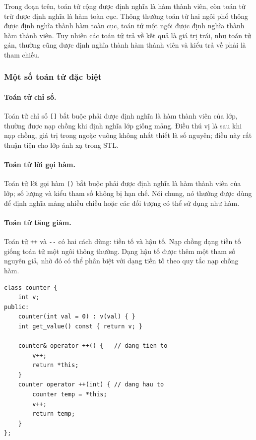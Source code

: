 \documentclass[11pt]{article}
\begin{document}
Trong đoạn trên, toán tử cộng được định nghĩa là hàm thành viên, còn toán tử
trừ được định nghĩa là hàm toàn cục. Thông thường toán tử hai ngôi phổ thông
được định nghĩa thành hàm toàn cục, toán tử một ngôi được định nghĩa thành
hàm thành viên. Tuy nhiên các toán tử trả về kết quả là giá trị trái, như
toán tử gán, thường cũng được định nghĩa thành hàm thành viên và kiểu trả về
phải là tham chiếu.

\subsubsection*{Một số toán tử đặc biệt}

\paragraph{Toán tử chỉ số.}
Toán tử chỉ số \verb|[]| bắt buộc phải được định nghĩa là hàm thành viên của
lớp, thường được nạp chồng khi định nghĩa lớp giống mảng. Điều thú vị là sau
khi nạp chồng, giá trị trong ngoặc vuông không nhất thiết là số nguyên; điều
này rất thuận tiện cho lớp ánh xạ trong STL.

\paragraph{Toán tử lời gọi hàm.}
Toán tử lời gọi hàm \verb|()| bắt buộc phải được định nghĩa là hàm thành viên
của lớp; số lượng và kiểu tham số không bị hạn chế. Nói chung, nó thường được
dùng để định nghĩa mảng nhiều chiều hoặc các đối tượng có thể sử dụng như
hàm.

\paragraph{Toán tử tăng giảm.}
Toán tử \verb|++| và \verb|--| có hai cách dùng: tiền tố và hậu tố. Nạp chồng
dạng tiền tố giống toán tử một ngôi thông thường. Dạng hậu tố được thêm một
tham số nguyên giả, nhờ đó có thể phân biệt với dạng tiền tố theo quy tắc nạp
chồng hàm.

\begin{verbatim}
class counter {
    int v;
public:
    counter(int val = 0) : v(val) { }
    int get_value() const { return v; }

    counter& operator ++() {   // dang tien to
        v++;
        return *this;
    }
    counter operator ++(int) { // dang hau to
        counter temp = *this;
        v++;
        return temp;
    }
};
\end{verbatim}
\end{document}
